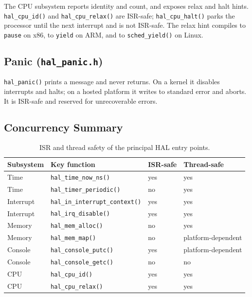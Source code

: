 The CPU subsystem reports identity and count, and exposes relax and halt hints.
\texttt{hal\_cpu\_id()} and \texttt{hal\_cpu\_relax()} are ISR-safe;
\texttt{hal\_cpu\_halt()} parks the processor until the next interrupt and is not
ISR-safe. The relax hint compiles to \texttt{pause} on x86, to \texttt{yield} on
ARM, and to \texttt{sched\_yield()} on Linux.

\subsection{Panic (\texttt{hal\_panic.h})}

\texttt{hal\_panic()} prints a message and never returns. On a kernel it disables
interrupts and halts; on a hosted platform it writes to standard error and
aborts. It is ISR-safe and reserved for unrecoverable errors.

\subsection{Concurrency Summary}

\begin{table}[h]
\centering
\begin{tabular}{llll}
\toprule
Subsystem & Key function & ISR-safe & Thread-safe \\
\midrule
Time      & \texttt{hal\_time\_now\_ns()}        & yes & yes \\
Time      & \texttt{hal\_timer\_periodic()}      & no  & yes \\
Interrupt & \texttt{hal\_in\_interrupt\_context()} & yes & yes \\
Interrupt & \texttt{hal\_irq\_disable()}         & yes & yes \\
Memory    & \texttt{hal\_mem\_alloc()}           & no  & yes \\
Memory    & \texttt{hal\_mem\_map()}             & no  & platform-dependent \\
Console   & \texttt{hal\_console\_putc()}        & yes & platform-dependent \\
Console   & \texttt{hal\_console\_getc()}        & no  & no \\
CPU       & \texttt{hal\_cpu\_id()}              & yes & yes \\
CPU       & \texttt{hal\_cpu\_relax()}           & yes & yes \\
\bottomrule
\end{tabular}
\caption{ISR and thread safety of the principal HAL entry points.}
\end{table}
